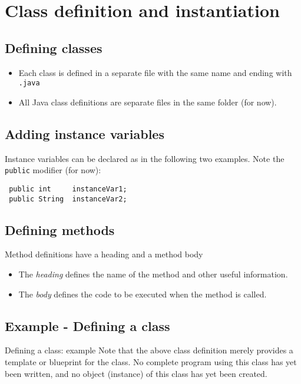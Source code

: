 \section{Class definition and instantiation}
\subsection{Defining classes}

    \begin{itemize}
    \item Each class is defined in a separate file with the same name and
    ending with \lstinline!.java!
  \item All Java class definitions are separate files in the same
    folder (for now).
    \end{itemize}

\subsection{Adding instance variables}

Instance variables can be declared as in the following two examples. Note the \lstinline!public! modifier (for now):
\begin{lstlisting}
 public int     instanceVar1;
 public String  instanceVar2;
\end{lstlisting}

\subsection{Defining methods}

Method definitions have a heading and a method body
  \begin{itemize}
  \item The \emph{heading} defines the name of the method 
  and other useful information.
  \item The \emph{body} defines the code to be executed when the method
  is called.
  \end{itemize}

\newpage
\subsection{Example - Defining a class}



Defining a class: example
Note that the above class definition  merely provides a template or blueprint for the class. No complete program using this class has yet been written, and no object (instance) of this class has yet been created. 

